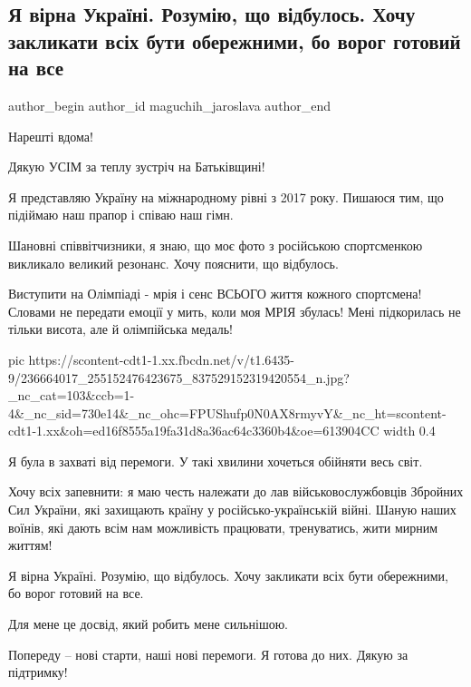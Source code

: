  
 
 
 
 
 
\subsection{Я вірна Україні. Розумію, що відбулось. Хочу закликати всіх бути обережними, бо ворог готовий на все}
\label{sec:12_08_2021.fb.maguchih_jaroslava.1.vrag_vernost}
 
\ifcmt
 author_begin
   author_id maguchih_jaroslava
 author_end
\fi

Нарешті вдома! 

Дякую УСІМ за теплу зустріч на Батьківщині! 

Я представляю Україну на міжнародному рівні з 2017 року. Пишаюся тим, що
підіймаю наш прапор і співаю наш гімн. 

Шановні співвітчизники, я знаю, що моє фото з російською спортсменкою викликало
великий резонанс. Хочу пояснити, що відбулось. 

Виступити на Олімпіаді - мрія і сенс ВСЬОГО життя кожного спортсмена! Словами
не передати емоції у мить, коли моя МРІЯ збулась! Мені підкорилась не тільки
висота, але й олімпійська медаль! 

\ifcmt
  pic https://scontent-cdt1-1.xx.fbcdn.net/v/t1.6435-9/236664017_255152476423675_837529152319420554_n.jpg?_nc_cat=103&ccb=1-4&_nc_sid=730e14&_nc_ohc=FPUShufp0N0AX8rmyvY&_nc_ht=scontent-cdt1-1.xx&oh=ed16f8555a19fa31d8a36ac64c3360b4&oe=613904CC
  width 0.4
\fi

Я була в захваті від перемоги. У такі хвилини хочеться обійняти весь світ. 

Хочу всіх запевнити: я маю честь належати до лав військовослужбовців Збройних
Сил України, які захищають країну у російсько-українській війні. Шаную наших
воїнів, які дають всім нам можливість працювати, тренуватись, жити мирним
життям! 

Я вірна Україні. Розумію, що відбулось. Хочу закликати всіх бути обережними, бо
ворог готовий на все.

Для мене це досвід, який робить мене сильнішою. 

Попереду – нові старти, наші нові перемоги. Я готова до них. Дякую за
підтримку!

